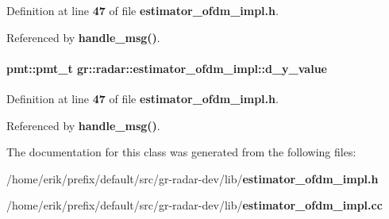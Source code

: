 Definition at line {\bf 47} of file {\bf estimator\+\_\+ofdm\+\_\+impl.\+h}.



Referenced by {\bf handle\+\_\+msg()}.

\paragraph[{d\+\_\+y\+\_\+value}]{\setlength{\rightskip}{0pt plus 5cm}pmt\+::pmt\+\_\+t gr\+::radar\+::estimator\+\_\+ofdm\+\_\+impl\+::d\+\_\+y\+\_\+value}\label{classgr_1_1radar_1_1estimator__ofdm__impl_a037a3e4384da9324e7946bc53705e144}


Definition at line {\bf 47} of file {\bf estimator\+\_\+ofdm\+\_\+impl.\+h}.



Referenced by {\bf handle\+\_\+msg()}.



The documentation for this class was generated from the following files\+:\begin{DoxyCompactItemize}
\item 
/home/erik/prefix/default/src/gr-\/radar-\/dev/lib/{\bf estimator\+\_\+ofdm\+\_\+impl.\+h}\item 
/home/erik/prefix/default/src/gr-\/radar-\/dev/lib/{\bf estimator\+\_\+ofdm\+\_\+impl.\+cc}\end{DoxyCompactItemize}

